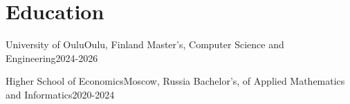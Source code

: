 \section{Education}
\resumeSubHeadingListStart
\resumeEduSubheading
{University of Oulu}{Oulu, Finland}
{Master's, Computer Science and Engineering}{2024-2026}
\resumeDesc{
	\vspace{7pt}
}

\resumeEduSubheading
{Higher School of Economics}{Moscow, Russia}
{Bachelor's, of Applied Mathematics and Informatics}{2020-2024}


\resumeSubHeadingListEnd
